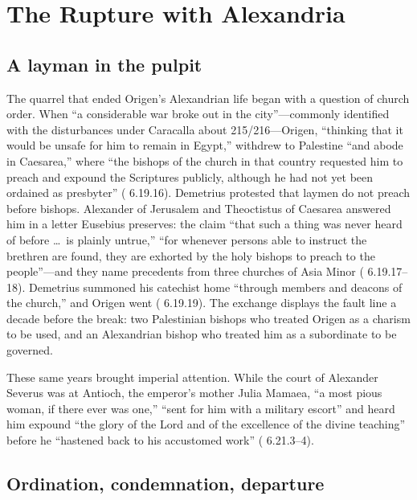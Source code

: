 \section{The Rupture with Alexandria}

\subsection{A layman in the pulpit}

The quarrel that ended Origen's Alexandrian life began with a question of
church order. When ``a considerable war broke out in the city''---commonly
identified with the disturbances under Caracalla about 215/216---Origen,
``thinking that it would be unsafe for him to remain in Egypt,'' withdrew to
Palestine ``and abode in Caesarea,'' where ``the bishops of the church in
that country requested him to preach and expound the Scriptures publicly,
although he had not yet been ordained as presbyter'' (
6.19.16). Demetrius protested that laymen do not preach before bishops.
Alexander of Jerusalem and Theoctistus of Caesarea answered him in a letter
Eusebius preserves: the claim ``that such a thing was never heard of before
\ldots\ is plainly untrue,'' ``for whenever persons able to instruct the
brethren are found, they are exhorted by the holy bishops to preach to the
people''---and they name precedents from three churches of Asia Minor
( 6.19.17--18). Demetrius summoned his catechist home
``through members and deacons of the church,'' and Origen went ( 6.19.19). The exchange displays the fault line a decade before the
break: two Palestinian bishops who treated Origen as a charism to be used,
and an Alexandrian bishop who treated him as a subordinate to be governed.

These same years brought imperial attention. While the court of Alexander
Severus was at Antioch, the emperor's mother Julia Mamaea, ``a most pious
woman, if there ever was one,'' ``sent for him with a military escort'' and
heard him expound ``the glory of the Lord and of the excellence of the
divine teaching'' before he ``hastened back to his accustomed work''
( 6.21.3--4).

\subsection{Ordination, condemnation, departure}

